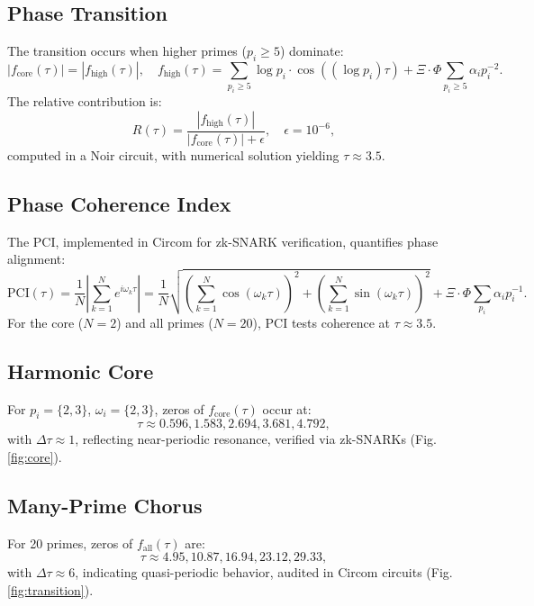 \documentclass{article}
\theoremstyle{plain}
\begin{document}
\subsection{Phase Transition}
The transition occurs when higher primes (\( p_i \geq 5 \)) dominate:
\begin{equation}
|f_{\text{core}}(\tau)| = |f_{\text{high}}(\tau)|, \quad f_{\text{high}}(\tau) = \sum_{p_i \geq 5} \log p_i \cdot \cos((\log p_i) \tau) + \Xi \cdot \Phi \sum_{p_i \geq 5} \alpha_i p_i^{-2}.
\end{equation}
The relative contribution is:
\begin{equation}
R(\tau) = \frac{|f_{\text{high}}(\tau)|}{|f_{\text{core}}(\tau)| + \epsilon}, \quad \epsilon = 10^{-6},
\end{equation}
computed in a Noir circuit, with numerical solution yielding \( \tau \approx 3.5 \).

\subsection{Phase Coherence Index}
The PCI, implemented in Circom for zk-SNARK verification, quantifies phase alignment:
\begin{equation}
\text{PCI}(\tau) = \frac{1}{N} \left| \sum_{k=1}^N e^{i \omega_k \tau} \right| = \frac{1}{N} \sqrt{\left( \sum_{k=1}^N \cos(\omega_k \tau) \right)^2 + \left( \sum_{k=1}^N \sin(\omega_k \tau) \right)^2} + \Xi \cdot \Phi \sum_{p_i} \alpha_i p_i^{-1}.
\end{equation}
For the core (\( N = 2 \)) and all primes (\( N = 20 \)), PCI tests coherence at \( \tau \approx 3.5 \).

\subsection{Harmonic Core}
For \( p_i = \{2, 3\} \), \( \omega_i = \{2, 3\} \), zeros of \( f_{\text{core}}(\tau) \) occur at:
\[
\tau \approx 0.596, 1.583, 2.694, 3.681, 4.792,
\]
with \( \Delta \tau \approx 1 \), reflecting near-periodic resonance, verified via zk-SNARKs (Fig. \ref{fig:core}).

\subsection{Many-Prime Chorus}
For 20 primes, zeros of \( f_{\text{all}}(\tau) \) are:
\[
\tau \approx 4.95, 10.87, 16.94, 23.12, 29.33,
\]
with \( \Delta \tau \approx 6 \), indicating quasi-periodic behavior, audited in Circom circuits (Fig. \ref{fig:transition}).
\end{document}
